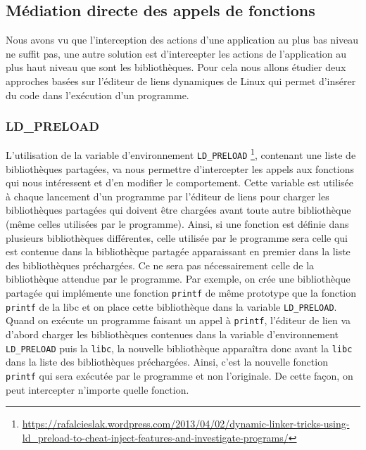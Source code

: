 \subsection{Médiation directe des appels de fonctions}

Nous avons vu que l'interception des actions d'une application au plus bas
niveau ne suffit pas, une autre solution est d'intercepter les actions de
l'application au plus haut niveau que sont les bibliothèques. Pour cela nous
allons étudier deux approches basées sur l'éditeur de liens dynamiques de Linux
qui permet d'insérer du code dans l'exécution d'un programme.

\subsubsection{LD\_PRELOAD}
\label{paragraphe:LDPreload}

L'utilisation de la variable d'environnement \texttt{LD\_PRELOAD}
\footnote{\url{https://rafalcieslak.wordpress.com/2013/04/02/dynamic-linker-tricks-using-ld\_preload-to-cheat-inject-features-and-investigate-programs/}}, contenant une liste de bibliothèques partagées, va nous
permettre d'intercepter les appels aux fonctions qui nous intéressent et d'en
modifier le comportement. Cette variable est utilisée à chaque lancement d'un
programme par l'éditeur de liens pour charger les bibliothèques partagées qui
doivent être chargées avant toute autre bibliothèque (même celles utilisées par
le programme). Ainsi, si une fonction est définie dans plusieurs bibliothèques
différentes, celle utilisée par le programme sera celle qui est contenue dans la
bibliothèque partagée apparaissant en premier dans la liste des bibliothèques
préchargées. Ce ne sera pas nécessairement celle de la bibliothèque
attendue par le programme. Par exemple, on crée une bibliothèque partagée qui
implémente une fonction \texttt{printf} de même prototype que la
fonction \texttt{printf} de la libc et on place cette bibliothèque dans la
variable \texttt{LD\_PRELOAD}. Quand on exécute un programme faisant un appel
à \texttt{printf}, l'éditeur de lien va d'abord charger les bibliothèques
contenues dans la variable d'environnement \texttt{LD\_PRELOAD} puis la \texttt{libc}, la
nouvelle bibliothèque apparaîtra donc avant la \texttt{libc} dans la liste des
bibliothèques préchargées. Ainsi, c'est la nouvelle fonction \texttt{printf}
qui sera exécutée par le programme et non l'originale. De cette façon, on peut
intercepter n'importe quelle fonction.

